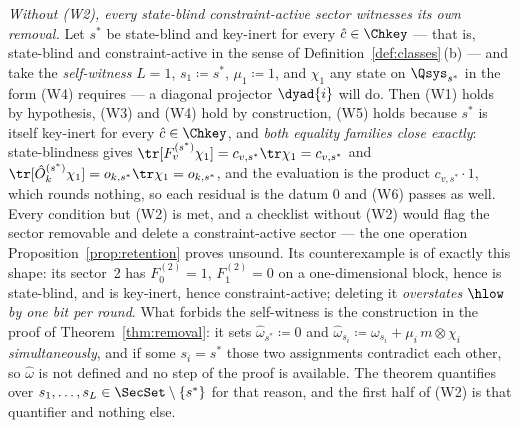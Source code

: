 \begin{remark}\label{rem:target-conditions}
\emph{Without (W2), every state-blind constraint-active sector witnesses
its own removal.} Let $s^{*}$ be state-blind and key-inert for every
$\hat c\in\Chkey$ --- that is, state-blind and constraint-active in the
sense of Definition~\ref{def:classes}\,(b) --- and take the
\emph{self-witness} $L=1$, $s_1\coloneqq s^{*}$, $\mu_1\coloneqq1$, and
$\chi_1$ any state on $\Qsys_{s^{*}}$ in the form (W4) requires --- a
diagonal projector $\dyad{i}$ will do. Then (W1) holds by hypothesis, (W3)
and (W4) hold by construction, (W5) holds because $s^{*}$ is itself
key-inert for every $\hat c\in\Chkey$, and \emph{both equality families
close exactly}: state-blindness gives
$\tr[F^{(s^{*})}_v\chi_1]=c_{v,s^{*}}\tr\chi_1=c_{v,s^{*}}$ and
$\tr[\hat O^{(s^{*})}_k\chi_1]=o_{k,s^{*}}\tr\chi_1=o_{k,s^{*}}$, and the
evaluation is the product $c_{v,s^{*}}\cdot1$, which rounds nothing, so
each residual is the datum $0$ and (W6) passes as well. Every condition
but (W2) is met, and a checklist without (W2) would flag the sector
removable and delete a constraint-active sector --- the one operation
Proposition~\ref{prop:retention} proves unsound. Its counterexample is of
exactly this shape: its sector~2 has $F^{(2)}_0=1$, $F^{(2)}_1=0$ on a
one-dimensional block, hence is state-blind, and is key-inert, hence
constraint-active; deleting it \emph{overstates $\hlow$ by one bit per
round}. What forbids the self-witness is the construction in the proof of
Theorem~\ref{thm:removal}: it sets $\hat\omega_{s^{*}}\coloneqq0$ and
$\hat\omega_{s_i}\coloneqq\omega_{s_i}+\mu_i\,m\otimes\chi_i$
\emph{simultaneously}, and if some $s_i=s^{*}$ those two assignments
contradict each other, so $\hat\omega$ is not defined and no step of the
proof is available. The theorem quantifies over
$s_1,\dots,s_L\in\SecSet\setminus\{s^{*}\}$ for that reason, and the
first half of (W2) is that quantifier and nothing else.


\end{remark}
